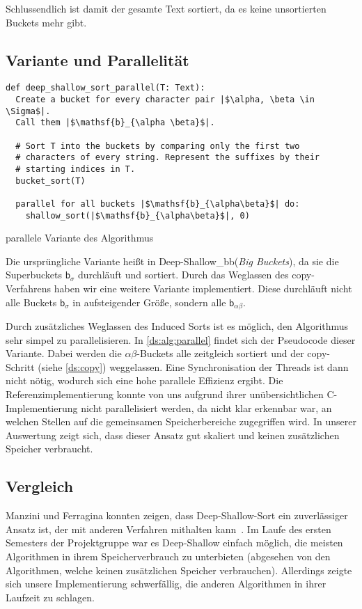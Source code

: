 Schlussendlich ist damit der gesamte Text sortiert, da es keine unsortierten Buckets mehr gibt.


\subsection{Variante und Parallelität}
\label{ds:zweite}

\begin{listing}[!h]
\begin{verbatim}
def deep_shallow_sort_parallel(T: Text):
  Create a bucket for every character pair |$\alpha, \beta \in \Sigma$|.
  Call them |$\mathsf{b}_{\alpha \beta}$|.

  # Sort T into the buckets by comparing only the first two
  # characters of every string. Represent the suffixes by their
  # starting indices in T.
  bucket_sort(T)

  parallel for all buckets |$\mathsf{b}_{\alpha\beta}$| do:
    shallow_sort(|$\mathsf{b}_{\alpha\beta}$|, 0)
\end{verbatim}
\caption{parallele Variante des Algorithmus}
\label{ds:alg:parallel}
\end{listing}

\noindent Die ursprüngliche Variante heißt in \sacabench \glqq Deep-Shallow\_bb\grqq (\emph{Big Buckets}),
da sie die Superbuckets $\mathsf b_\sigma$ durchläuft und sortiert.
Durch das Weglassen des copy-Verfahrens haben wir eine weitere Variante implementiert.
Diese durchläuft nicht alle Buckets $\mathsf b_\sigma$ in aufsteigender Größe,
sondern alle $\mathsf b_{\alpha\beta}$.

Durch zusätzliches Weglassen des Induced Sorts ist es möglich,
den Algorithmus sehr simpel zu parallelisieren.
In \cref{ds:alg:parallel} findet sich der Pseudocode dieser Variante.
Dabei werden die $\alpha\beta$-Buckets alle zeitgleich sortiert und
der copy-Schritt (siehe \cref{ds:copy}) weggelassen.
Eine Synchronisation der Threads ist dann nicht nötig, wodurch sich eine hohe parallele Effizienz ergibt.
Die Referenzimplementierung konnte von uns aufgrund ihrer unübersichtlichen C-Implementierung nicht parallelisiert werden,
da nicht klar erkennbar war, an welchen Stellen auf die gemeinsamen Speicherbereiche zugegriffen wird.
In unserer Auswertung zeigt sich, dass dieser Ansatz gut skaliert und keinen zusätzlichen Speicher verbraucht.

\subsection{Vergleich}
Manzini und Ferragina konnten zeigen, dass Deep-Shallow-Sort ein zuverlässiger Ansatz ist, der mit anderen Verfahren mithalten kann~\cite{saca:4}.
Im Laufe des ersten Semesters der Projektgruppe war es Deep-Shallow einfach möglich,
die meisten Algorithmen in ihrem Speicherverbrauch zu unterbieten (abgesehen von den Algorithmen, welche keinen zusätzlichen Speicher verbrauchen).
Allerdings zeigte sich unsere Implementierung schwerfällig, die anderen Algorithmen in ihrer Laufzeit zu schlagen.